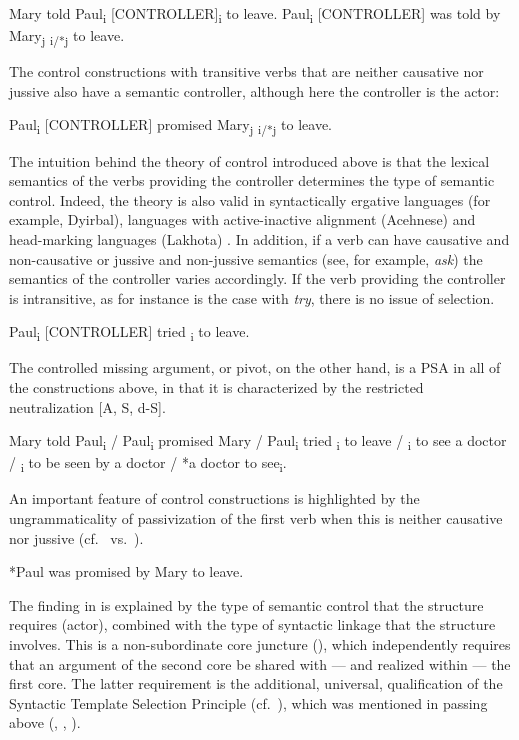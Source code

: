 \documentclass[output=paper,hidelinks]{langscibook}
\begin{document}
\ea%
   \label{ex:RRG:24}
   \ea\label{ex:RRG:24a} Mary told Paul\textsubscript{i} [CONTROLLER]\GAP\textsubscript{i} to leave.
   \ex\label{ex:RRG:24b} Paul\textsubscript{i} [CONTROLLER] was told by Mary\textsubscript{j} \GAP\textsubscript{i/*j} to leave.
   \z\z

\noindent The control constructions with transitive verbs that are neither causative nor jussive also have a semantic controller, although here the controller is the actor:

\ea%
   \label{ex:RRG:25}
   Paul\textsubscript{i} [CONTROLLER] promised Mary\textsubscript{j} \GAP\textsubscript{i/*j} to leave.
   \z

\noindent  The intuition behind the theory of control introduced above is that the lexical semantics of the verbs providing the controller determines the type of semantic control. Indeed, the theory is also valid in syntactically ergative languages (for example, Dyirbal), languages with active-inactive alignment (Acehnese) and head-marking languages (Lakhota) \citep[241]{VanValin2005}. In addition, if a verb can have causative and non-causative or jussive and non-jussive semantics (see, for example, \textit{ask}) the semantics of the controller varies accordingly. If the verb providing the controller is intransitive, as for instance is the case with \textit{try}, there is no issue of selection.

\ea%
   \label{ex:RRG:26}
   Paul\textsubscript{i} [CONTROLLER] tried \GAP\textsubscript{i} to leave.
   \z

\noindent The controlled missing argument, or pivot, on the other hand, is a PSA in all of the constructions above, in that it is characterized by the restricted neutralization [A, S, d-S].

\ea%
   \label{ex:RRG:27}
   Mary told Paul\textsubscript{i} / Paul\textsubscript{i} promised Mary / Paul\textsubscript{i} tried \GAP\textsubscript{i} to leave / \GAP\textsubscript{i} to see a doctor / \GAP\textsubscript{i} to be seen by a doctor / *a doctor to see\GAP\textsubscript{i}.
   \z

  An important feature of control constructions is highlighted by the ungrammaticality of passivization of the first verb when this is neither causative nor jussive (cf.\  vs.\ ).

\ea%
   \label{ex:RRG:28}
   *Paul was promised by Mary to leave.
   \z

\noindent The finding in  is explained by the type of semantic control that the structure requires (actor), combined with the type of syntactic linkage that the structure involves. This is a non-subordinate core juncture (), which independently requires that an argument of the second core be shared with --- and realized within --- the first core. The latter requirement is the additional, universal, qualification of the Syntactic Template Selection Principle (cf.\ ), which was mentioned in passing above (\citealt[546]{VanValin1997}, \citealt[244-245]{VanValin2005}, \citealt{Paris2022}).
\end{document}
